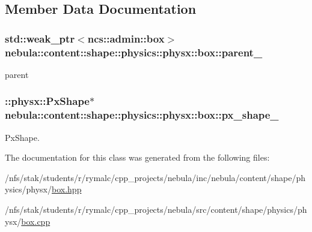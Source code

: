 \subsection{Member Data Documentation}
\hypertarget{classnebula_1_1content_1_1shape_1_1physics_1_1physx_1_1box_ac630d4ca757f32941bb81620ffd82ad1}{
\subsubsection[{parent\_\-}]{\setlength{\rightskip}{0pt plus 5cm}std::weak\_\-ptr$<${\bf ncs::admin::box}$>$ {\bf nebula::content::shape::physics::physx::box::parent\_\-}}}
\label{classnebula_1_1content_1_1shape_1_1physics_1_1physx_1_1box_ac630d4ca757f32941bb81620ffd82ad1}


parent \hypertarget{classnebula_1_1content_1_1shape_1_1physics_1_1physx_1_1box_a4c358ddb71d2e6530ba14c13f82c175e}{
\subsubsection[{px\_\-shape\_\-}]{\setlength{\rightskip}{0pt plus 5cm}::physx::PxShape$\ast$ {\bf nebula::content::shape::physics::physx::box::px\_\-shape\_\-}}}
\label{classnebula_1_1content_1_1shape_1_1physics_1_1physx_1_1box_a4c358ddb71d2e6530ba14c13f82c175e}


PxShape. 

The documentation for this class was generated from the following files:\begin{DoxyCompactItemize}
\item 
/nfs/stak/students/r/rymalc/cpp\_\-projects/nebula/inc/nebula/content/shape/physics/physx/\hyperlink{physics_2physx_2box_8hpp}{box.hpp}\item 
/nfs/stak/students/r/rymalc/cpp\_\-projects/nebula/src/content/shape/physics/physx/\hyperlink{physics_2physx_2box_8cpp}{box.cpp}\end{DoxyCompactItemize}
